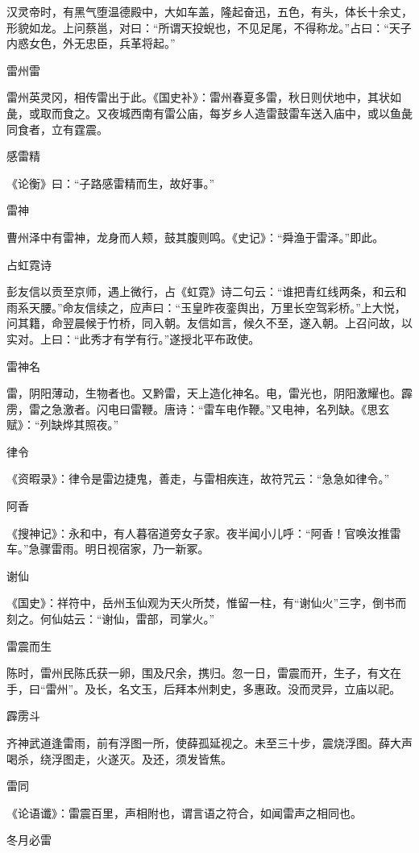 \documentclass[a4paper,12pt,UTF8,twoside]{ctexbook}
\begin{document}
	汉灵帝时，有黑气堕温德殿中，大如车盖，隆起奋迅，五色，有头，体长十余丈，形貌如龙。上问蔡邕，对曰：“所谓天投蜺也，不见足尾，不得称龙。”占曰：“天子内惑女色，外无忠臣，兵革将起。”
	
	雷州雷
	
	雷州英灵冈，相传雷出于此。《国史补》：雷州春夏多雷，秋日则伏地中，其状如彘，或取而食之。又夜城西南有雷公庙，每岁乡人造雷鼓雷车送入庙中，或以鱼彘同食者，立有霆震。
	
	感雷精
	
	《论衡》曰：“子路感雷精而生，故好事。”
	
	雷神
	
	曹州泽中有雷神，龙身而人颊，鼓其腹则鸣。《史记》：“舜渔于雷泽。”即此。
	
	占虹霓诗
	
	彭友信以贡至京师，遇上微行，占《虹霓》诗二句云：“谁把青红线两条，和云和雨系天腰。”命友信续之，应声曰：“玉皇昨夜銮舆出，万里长空驾彩桥。”上大悦，问其籍，命翌晨候于竹桥，同入朝。友信如言，候久不至，遂入朝。上召问故，以实对。上曰：“此秀才有学有行。”遂授北平布政使。
	
	雷神名
	
	雷，阴阳薄动，生物者也。又黔雷，天上造化神名。电，雷光也，阴阳激耀也。霹雳，雷之急激者。闪电曰雷鞭。唐诗：“雷车电作鞭。”又电神，名列缺。《思玄赋》：“列缺烨其照夜。”
	
	律令
	
	《资暇录》：律令是雷边捷鬼，善走，与雷相疾连，故符咒云：“急急如律令。”
	
	阿香
	
	《搜神记》：永和中，有人暮宿道旁女子家。夜半闻小儿呼：“阿香！官唤汝推雷车。”急骤雷雨。明日视宿家，乃一新冢。
	
	谢仙
	
	《国史》：祥符中，岳州玉仙观为天火所焚，惟留一柱，有“谢仙火”三字，倒书而刻之。何仙姑云：“谢仙，雷部，司掌火。”
	
	雷震而生
	
	陈时，雷州民陈氏获一卵，围及尺余，携归。忽一日，雷震而开，生子，有文在手，曰“雷州”。及长，名文玉，后拜本州刺史，多惠政。没而灵异，立庙以祀。
	
	霹雳斗
	
	齐神武道逢雷雨，前有浮图一所，使薛孤延视之。未至三十步，震烧浮图。薛大声喝杀，绕浮图走，火遂灭。及还，须发皆焦。
	
	雷同
	
	《论语谶》：雷震百里，声相附也，谓言语之符合，如闻雷声之相同也。
	
	冬月必雷
	
\end{document}

